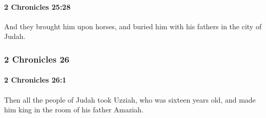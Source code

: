 		\paragraph{2 Chronicles 25:28} %
			\label{2CHRONICLES-25-28}

			And they brought him upon horses, and buried him with his fathers in the city of Judah.

	\subsubsection{2 Chronicles 26} %
		\label{2CHRONICLES-26}

		\paragraph{2 Chronicles 26:1} %
			\label{2CHRONICLES-26-1}

			Then all the people of Judah took Uzziah, who was sixteen years old, and made him king in the room of his father Amaziah.

